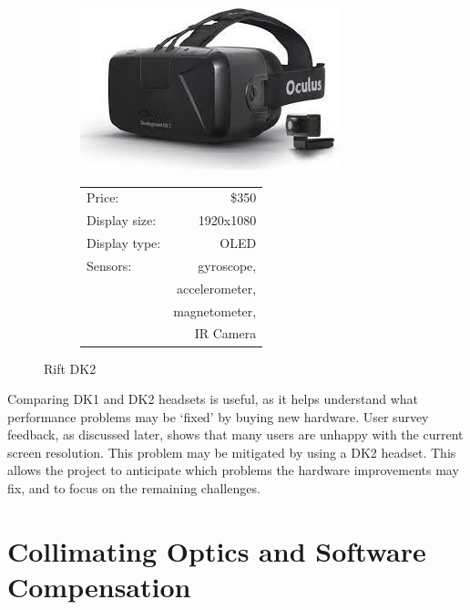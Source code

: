 \documentclass[MSc,paper=a4,pagesize=auto]{icldt}
\begin{document}
\begin{figure}[htbp!]
\centering
\begin{subfigure}{0.5\textwidth}
    \centering
    \includegraphics[width=1\linewidth]{resources/dk2}
\end{subfigure}%
\centering
\begin{subfigure}{0.5\textwidth}
    \centering
   	\begin{tabular}{ l r }
   	Price:      		& \$350 \\
  	Display size:	& 1920x1080 \\
  	Display type:	& OLED \\
	Sensors:			& gyroscope,\\
					& accelerometer,\\
					& magnetometer,\\	
					& IR Camera\\
\end{tabular}
\end{subfigure} 
    \caption{Rift DK2}
    \label{fig:dk2}
\end{figure}

Comparing DK1 and DK2 headsets is useful, as it helps understand what performance problems may be `fixed' by buying new hardware. User survey feedback, as discussed later, shows that many users are unhappy with the current screen resolution. This problem may be mitigated by using a DK2 headset. This allows the project to anticipate which problems the hardware improvements may fix, and to focus on the remaining challenges.

\clearpage
\section{Collimating Optics and Software Compensation}
\end{document}
